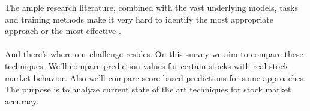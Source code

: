 \documentclass[conference]{IEEEtran}
\begin{document}
The ample research literature, combined with the vast underlying models, tasks and training methods make it very
hard to identify the most appropriate approach or the most effective \cite{raghu2020survey}.
\\\\
And there's where our challenge resides. On this survey we aim to compare these techniques. We'll compare prediction values for certain stocks with real stock market behavior. Also we'll compare score based predictions for some approaches.
The purpose is to analyze current state of the art techniques for stock market accuracy\cite{Singh2016}.
\end{document}
